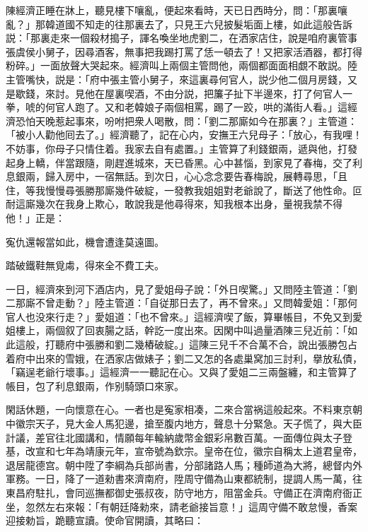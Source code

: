 陳經濟正睡在牀上，聽見樓下嚷亂，便起來看時，天已日西時分，問：「那裏嚷亂？」那韓道國不知走的往那裏去了，只見王六兒披髮垢面上樓，如此這般告訴説：「那裏走來一個殺材搗子，諢名喚坐地虎劉二，在洒家店住，說是咱府裏管事張虞侯小舅子，因尋酒客，無事把我踢打罵了恁一頓去了！又把家活酒器，都打得粉碎。」一面放聲大哭起來。經濟叫上兩個主管問他，兩個都面面相覷不敢説。陸主管嘴快，説是：「府中張主管小舅子，來這裏尋何官人，説少他二個月房錢，又是歇錢，來討。見他在屋裏喫酒，不由分説，把簾子扯下半邊來，打了何官人一拳，唬的何官人跑了。又和老韓娘子兩個相罵，踢了一跤，哄的滿街人看。」這經濟恐怕天晚惹起事來，吩咐把衆人喝散，問：「劉二那廝如今在那裏？」主管道：「被小人勸他囘去了。」經濟聽了，記在心内，安撫王六兒母子：「放心，有我哩！不妨事，你母子只情住着。我家去自有處置。」主管算了利錢銀兩，遞與他，打發起身上轎，伴當跟隨，剛趕進城來，天已昏黑。心中甚惱，到家見了春梅，交了利息銀兩，歸入房中，一宿無話。到次日，心心念念要告春梅說，展轉尋思，「且住，等我慢慢尋張勝那廝幾件破綻，一發教我姐姐對老爺說了，斷送了他性命。叵耐這廝幾次在我身上欺心，敢說我是他尋得來，知我根本出身，量視我禁不得他！」正是：

\begin{myquote}
寃仇還報當如此，機會遭逢莫遠圖。

踏破鐵鞋無覓䖏，得來全不費工夫。
\end{myquote}

一日，經濟來到河下酒店内，見了愛姐母子說：「外日喫驚。」又問陸主管道：「劉二那廝不曾走動？」陸主管道：「自従那日去了，再不曾來。」又問韓愛姐：「那何官人也没來行走？」愛姐道：「也不曾來。」這經濟喫了飯，算畢帳目，不免又到愛姐樓上，兩個叙了回衷腸之話，幹訖一度出來。因閑中叫過量酒陳三兒近前：「如此這般，打聽府中張勝和劉二幾樁破綻。」這陳三兒千不合萬不合，說出張勝包占着府中出來的雪娥，在洒家店做婊子；劉二又怎的各處巢窝加三討利，擧放私債，「竊逞老爺行壞事。」這經濟一一聽記在心。又與了愛姐二三兩盤纏，和主管算了帳目，包了利息銀兩，作别騎頭口來家。

閑話休題，一向懷意在心。一者也是寃家相凑，二來合當祸這般起來。不料東京朝中徽宗天子，見大金人馬犯邊，搶至腹内地方，聲息十分緊急。天子慌了，與大臣計議，差官往北國講和，情願每年輸納歲幣金銀彩帛數百萬。一面傳位與太子登基，改宣和七年為靖康元年，宣帝號為欽宗。皇帝在位，徽宗自稱太上道君皇帝，退居龍德宫。朝中陞了李綱為兵部尚書，分部諸路人馬；種師道為大將，總督内外軍務。一日，降了一道勑書來濟南府，陞周守備為山東都統制，提調人馬一萬，往東昌府駐扎，會同巡撫都御史張叔夜，防守地方，阻當金兵。守備正在濟南府衙正坐，忽然左右來報：「有朝廷降勑來，請老爺接旨意！」這周守備不敢怠慢，香案迎接勅旨，跪聽宣讀。使命官開讀，其略曰：

